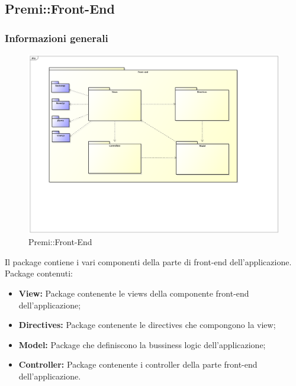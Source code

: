 \subsection{Premi::Front-End}
	\subsubsection{Informazioni generali}
		\begin{figure}[h]
		\centering
		\includegraphics[width=0.9\linewidth]{img/general-front-end}
		\caption[Premi::Front-End]{Premi::Front-End}
		\end{figure}

	Il package contiene i vari componenti della parte di front-end dell'applicazione.
	\\Package contenuti:
	\begin{itemize}
		\item \textbf{View:} Package contenente le views della componente front-end dell'applicazione;
		\item \textbf{Directives:} Package contenente le directives che compongono la view;
		\item \textbf{Model:} Package che definiscono la bussiness logic dell'applicazione;
		\item \textbf{Controller:} Package contenente i controller della parte front-end dell'applicazione.
	\end{itemize}